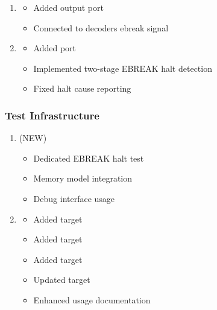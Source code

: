 \begin{record}

\begin{enumerate}
\def\labelenumi{\arabic{enumi}.}
\item

  \begin{itemize}
  \tightlist
  \item
    Added  output port
  \item
    Connected to decoder\textquotesingle s ebreak signal
  \end{itemize}
\item

  \begin{itemize}
  \tightlist
  \item
    Added  port
  \item
    Implemented two-stage EBREAK halt detection
  \item
    Fixed halt cause reporting
  \end{itemize}
\end{enumerate}

\end{record}

\subsubsection{Test Infrastructure}\label{cr:app:archive-session-summary:test-infrastructure}

\begin{record}

\begin{enumerate}
\def\labelenumi{\arabic{enumi}.}
\setcounter{enumi}{2}
\item
   (NEW)

  \begin{itemize}
  \tightlist
  \item
    Dedicated EBREAK halt test
  \item
    Memory model integration
  \item
    Debug interface usage
  \end{itemize}
\item

  \begin{itemize}
  \tightlist
  \item
    Added  target
  \item
    Added  target
  \item
    Added  target
  \item
    Updated  target
  \item
    Enhanced usage documentation
  \end{itemize}
\end{enumerate}

\end{record}

